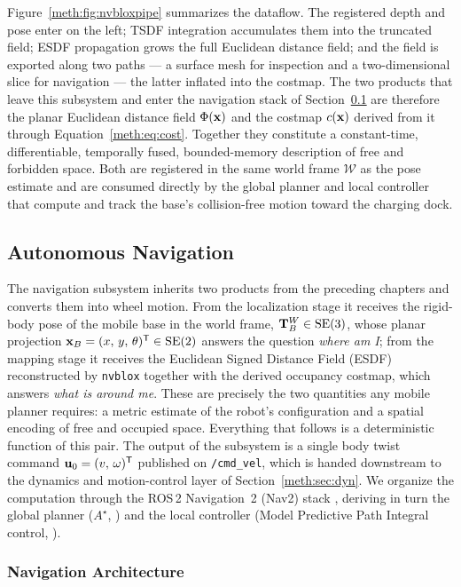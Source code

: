 Figure~\ref{meth:fig:nvbloxpipe} summarizes the dataflow. The registered depth and pose enter on the left; TSDF integration accumulates them into the truncated field; ESDF propagation grows the full Euclidean distance field; and the field is exported along two paths --- a surface mesh for inspection and a two-dimensional slice for navigation --- the latter inflated into the costmap. The two products that leave this subsystem and enter the navigation stack of Section~\ref{meth:sec:nav} are therefore the planar Euclidean distance field $\Phi(\mathbf{x})$ and the costmap $c(\mathbf{x})$ derived from it through Equation~\eqref{meth:eq:cost}. Together they constitute a constant-time, differentiable, temporally fused, bounded-memory description of free and forbidden space. Both are registered in the same world frame $\mathcal W$ as the pose estimate and are consumed directly by the global planner and local controller that compute and track the base's collision-free motion toward the charging dock.


\subsection{Autonomous Navigation}\label{meth:sec:nav}

The navigation subsystem inherits two products from the preceding chapters and converts
them into wheel motion. From the localization stage it receives the rigid-body pose of the
mobile base in the world frame, $\mathbf{T}^{W}_{B}\in\mathrm{SE}(3)$, whose planar projection
$\mathbf{x}_B=(x,\,y,\,\theta)^{\mathsf{T}}\in\mathrm{SE}(2)$ answers the question \emph{where am I}; from the mapping
stage it receives the Euclidean Signed Distance Field (ESDF) reconstructed by \texttt{nvblox}
together with the derived occupancy costmap, which answers \emph{what is around me}. These are
precisely the two quantities any mobile planner requires: a metric estimate of the robot's
configuration and a spatial encoding of free and occupied space. Everything that follows is a
deterministic function of this pair. The output of the subsystem is a single body twist command
$\mathbf{u}_0=(v,\,\omega)^{\mathsf{T}}$ published on \texttt{/cmd\_vel}, which is handed downstream to the
dynamics and motion-control layer of Section~\ref{meth:sec:dyn}. We organize the computation through the
ROS\,2 Navigation~2 (Nav2) stack \cite{macenski_2020_nav2}, deriving in turn the global planner
($A^{\star}$, \cite{hart1968astar}) and the local controller (Model Predictive Path Integral
control, \cite{williams2017mppi}).

\subsubsection{Navigation Architecture}\label{meth:sec:nav-arch}


